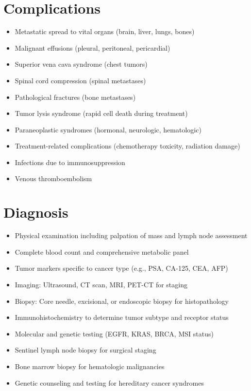 \section{Complications}
\begin{itemize}[noitemsep]
  \item Metastatic spread to vital organs (brain, liver, lungs, bones)
  \item Malignant effusions (pleural, peritoneal, pericardial)
  \item Superior vena cava syndrome (chest tumors)
  \item Spinal cord compression (spinal metastases)
  \item Pathological fractures (bone metastases)
  \item Tumor lysis syndrome (rapid cell death during treatment)
  \item Paraneoplastic syndromes (hormonal, neurologic, hematologic)
  \item Treatment-related complications (chemotherapy toxicity, radiation damage)
  \item Infections due to immunosuppression
  \item Venous thromboembolism
\end{itemize}
\section{Diagnosis}
\begin{itemize}[noitemsep]
  \item Physical examination including palpation of mass and lymph node assessment
  \item Complete blood count and comprehensive metabolic panel
  \item Tumor markers specific to cancer type (e.g., PSA, CA-125, CEA, AFP)
  \item Imaging: Ultrasound, CT scan, MRI, PET-CT for staging
  \item Biopsy: Core needle, excisional, or endoscopic biopsy for histopathology
  \item Immunohistochemistry to determine tumor subtype and receptor status
  \item Molecular and genetic testing (EGFR, KRAS, BRCA, MSI status)
  \item Sentinel lymph node biopsy for surgical staging
  \item Bone marrow biopsy for hematologic malignancies
  \item Genetic counseling and testing for hereditary cancer syndromes
\end{itemize}
